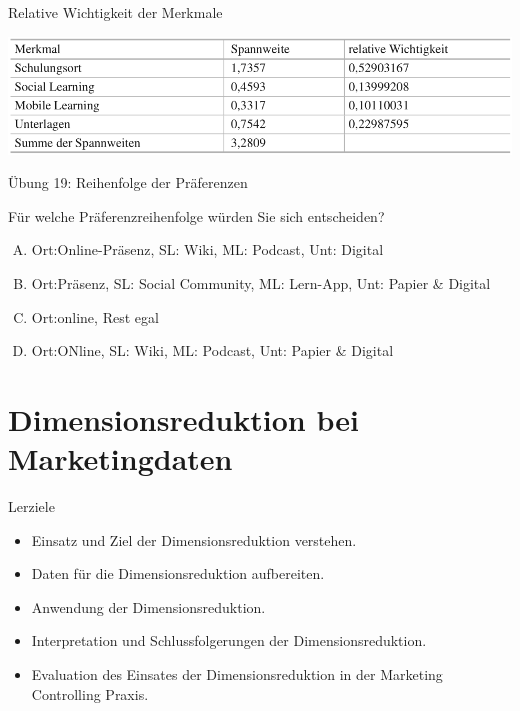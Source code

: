 \documentclass[12pt,ngerman,a4paper,ignorenonframetext,]{beamer}
\providecommand{\tightlist}{%
  \setlength{\itemsep}{0pt}\setlength{\parskip}{0pt}}
\begin{document}
\begin{frame}{Relative Wichtigkeit der Merkmale}
\protect\hypertarget{relative-wichtigkeit-der-merkmale}{}

\begin{center}\includegraphics[width=0.8\linewidth]{./images/Marketingcontrolling/Wichtigkeit} \end{center}

\end{frame}

\begin{frame}{Übung 19: Reihenfolge der Präferenzen}
\protect\hypertarget{ubung-19-reihenfolge-der-praferenzen}{}

Für welche Präferenzreihenfolge würden Sie sich entscheiden?

\begin{enumerate}
[A.]
\tightlist
\item
  Ort:Online-Präsenz, SL: Wiki, ML: Podcast, Unt: Digital
\item
  Ort:Präsenz, SL: Social Community, ML: Lern-App, Unt: Papier \&
  Digital
\item
  Ort:online, Rest egal
\item
  Ort:ONline, SL: Wiki, ML: Podcast, Unt: Papier \& Digital
\end{enumerate}


\end{frame}

\hypertarget{dimensionsreduktion-bei-marketingdaten}{%
\section{Dimensionsreduktion bei
Marketingdaten}\label{dimensionsreduktion-bei-marketingdaten}}

\begin{frame}{Lerziele}
\protect\hypertarget{lerziele}{}

\begin{itemize}
\tightlist
\item
  Einsatz und Ziel der Dimensionsreduktion verstehen.
\item
  Daten für die Dimensionsreduktion aufbereiten.
\item
  Anwendung der Dimensionsreduktion.
\item
  Interpretation und Schlussfolgerungen der Dimensionsreduktion.
\item
  Evaluation des Einsates der Dimensionsreduktion in der Marketing
  Controlling Praxis.
\end{itemize}

\end{frame}
\end{document}
